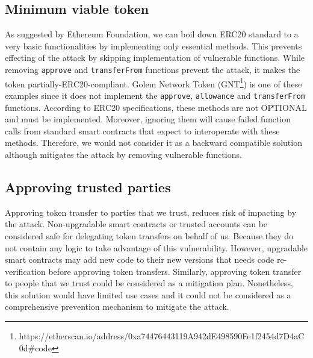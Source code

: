 \subsection{Minimum viable token}
As suggested by Ethereum Foundation\cite{Ref05}, we can boil down ERC20 standard to a very basic functionalities by implementing only essential methods. This prevents effecting of the attack by skipping implementation of vulnerable functions. While removing \texttt{approve} and \texttt{transferFrom} functions prevent the attack, it makes the token partially-ERC20-compliant. Golem Network Token (GNT\footnote{https://etherscan.io/address/0xa74476443119A942dE498590Fe1f2454d7\newline D4aC0d\#code}) is one of these examples since it does not implement the \texttt{approve}, \texttt{allowance} and \texttt{transferFrom} functions. According to ERC20 specifications\cite{Ref08}, these methods are not OPTIONAL and must be implemented. Moreover, ignoring them will cause failed function calls from standard smart contracts that expect to interoperate with these methods. Therefore, we would not consider it as a backward compatible solution although mitigates the attack by removing vulnerable functions.

\subsection{Approving trusted parties}
Approving token transfer to parties that we trust, reduces risk of impacting by the attack. Non-upgradable smart contracts or trusted accounts can be considered safe for delegating token transfers on behalf of us. Because they do not contain any logic to take advantage of this vulnerability. However, upgradable smart contracts may add new code to their new versions that needs code re-verification before approving token transfers. Similarly, approving token transfer to people that we trust could be considered as a mitigation plan. Nonetheless, this solution would have limited use cases and it could not be considered as a comprehensive prevention mechanism to mitigate the attack.

